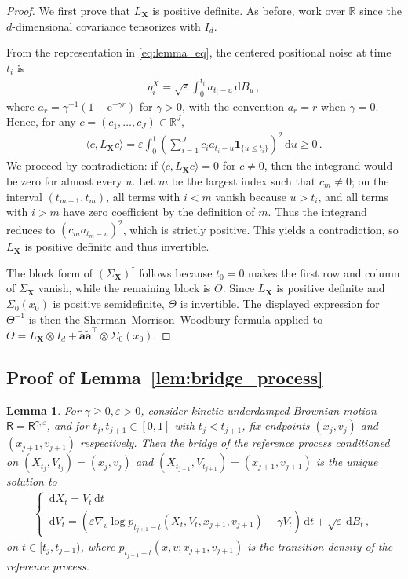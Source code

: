 \documentclass[12pt]{article}
\theoremstyle{plain}
\theoremstyle{plain}
\theoremstyle{remark}
\newcommand{\R}{\mathbb{R}}
\newcommand{\dd}{\,\mathrm{d}}
\newcommand{\rme}{\mathrm{e}}
\newcommand{\eps}{\varepsilon}
\newcommand{\1}{\bm{1}}
\theoremstyle{plain}
\newtheorem{lemma}[theorem]{Lemma}
\theoremstyle{definition}
\theoremstyle{remark}
\begin{document}
\begin{proof}
We first prove that $L_{\bm X}$ is positive definite. As before, work over $\R$ since the $d$-dimensional covariance tensorizes with $I_d$.

From the representation in \eqref{eq:lemma_eq}, the centered positional noise at time $t_i$ is
\begin{align*}
    \eta_i^X = \sqrt{\eps}\int_0^{t_i} a_{t_i-u}\dd B_u\,,
\end{align*}
where $a_r = \gamma^{-1}(1-\rme^{-\gamma r})$ for $\gamma>0$, with the convention $a_r=r$ when $\gamma=0$. Hence, for any $c=(c_1,\ldots,c_J)\in\R^J$,
\begin{align*}
        \langle c, L_{\bm X} c\rangle
    =
    \eps\int_0^{1}
    \left(
        \sum_{i=1}^J c_i a_{t_i-u}\bm 1_{\{u\leq t_i\}}
    \right)^2
    \dd u \geq 0\,.
\end{align*}
We proceed by contradiction: if $\langle c, L_{\bm X} c\rangle = 0$ for $c \neq 0$, then the integrand would be zero for almost every $u$. Let $m$ be the largest index such that $c_m\neq 0$; on the interval $(t_{m-1},t_m)$, all terms with $i<m$ vanish because $u>t_i$, and all terms with $i>m$ have zero coefficient by the definition of $m$. Thus the integrand reduces to $(c_m a_{t_m-u})^2$, which is strictly positive. This yields a contradiction, so $L_{\bm X}$ is positive definite and thus invertible.

The block form of $(\Sigma_{\bm X})^\dagger$ follows because $t_0=0$ makes the first row and column of $\Sigma_{\bm X}$ vanish, while the remaining block is $\Theta$. Since $L_{\bm X}$ is positive definite and $\Sigma_0(x_0)$ is positive semidefinite, $\Theta$ is invertible. The displayed expression for $\Theta^{-1}$ is then the Sherman--Morrison--Woodbury formula applied to $\Theta=L_{\bm X}\otimes I_d + \tilde{\bm a}\tilde{\bm a}^\top\otimes \Sigma_0(x_0)$.
\end{proof}

\subsection{Proof of Lemma~\ref{lem:bridge_process}}\label{sec:proof-bridge-process}
\begin{lemma}
For $\gamma \geq 0, \eps > 0$, consider  kinetic underdamped Brownian motion $\mathsf R = \mathsf R^{\gamma,\eps}$, and for $t_j, t_{j+1} \in [0,1]$ with $t_j < t_{j+1}$, fix endpoints $(x_j,v_j)$ and $(x_{j+1},v_{j+1})$ respectively. Then the bridge of the reference process conditioned on $(X_{t_j},V_{t_j}) = (x_j,v_j)$ and $(X_{t_{j+1}},V_{t_{j+1}}) = (x_{j+1},v_{j+1})$ is the unique solution to
\begin{align}\label{eq:bridge_sde_general}
    \begin{cases}
        \dd X_t = V_t\dd t \\
        \dd V_t = (\eps\nabla_v \log p_{t_{j+1}-t}(X_t,V_t,x_{j+1},v_{j+1}) - \gamma V_t)\dd t + \sqrt{\varepsilon} \dd B_t\,,
    \end{cases}
\end{align}
on $t \in [t_j,t_{j+1})$, where $p_{t_{j+1} - t}(x,v;x_{j+1},v_{j+1})$ is the transition density of the reference process.
\end{lemma}
\end{document}
